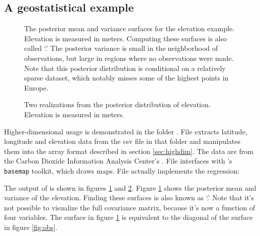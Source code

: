 \documentclass{manual}
\begin{document}
\subsection{A geostatistical example}\label{sub:geostat}
\begin{figure}
    \centering
    \caption{The posterior mean and variance surfaces for the elevation example. Elevation is measured in meters. Computing these surfaces is also called `.' The posterior variance is small in the neighborhood of observations, but large in regions where no observations were made. Note that this posterior distribution is conditional on a relatively sparse dataset, which notably misses some of the highest points in Europe.}
    \label{fig:elev}
\end{figure}
\begin{figure}
    \centering
    \caption{Two realizations from the posterior distribution of elevation. Elevation is measured in meters.}
    \label{fig:elevreal}
\end{figure}
Higher-dimensional usage is demonstrated in the folder . File  extracts latitude, longitude and elevation data from the csv file in that folder and manipulates them into the array format described in section \ref{sec:highdim}. The data are from the Carbon Dioxide Information Analysis Center's . File  interfaces with 's \texttt{basemap} toolkit, which draws maps. File  actually implements the regression:
  

The output of  is shown in figures \ref{fig:elev} and \ref{fig:elevreal}. Figure \ref{fig:elev} shows the posterior mean and variance of the elevation. Finding these surfaces is also known as `.' Note that it's not possible to visualize the full covariance matrix, because it's now a function of four variables. The surface in figure \ref{fig:elev} is equivalent to the diagonal of the surface in figure \ref{fig:obs}.
\end{document}
